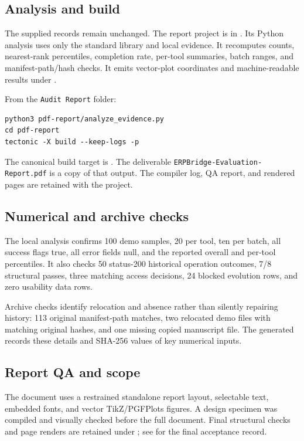 \subsection*{Analysis and build}
The supplied records remain unchanged. The report project is in . Its Python analysis uses only the standard library and local evidence. It recomputes counts, nearest-rank percentiles, completion rate, per-tool summaries, batch ranges, and manifest-path/hash checks. It emits vector-plot coordinates and machine-readable results under .

From the \texttt{Audit Report} folder:
\begin{lstlisting}[numbers=none,basicstyle=\CodeFont\footnotesize]
python3 pdf-report/analyze_evidence.py
cd pdf-report
tectonic -X build --keep-logs -p
\end{lstlisting}
The canonical build target is . The deliverable \texttt{ERPBridge-Evaluation-Report.pdf} is a copy of that output. The compiler log, QA report, and rendered pages are retained with the project.

\subsection*{Numerical and archive checks}
The local analysis confirms 100 demo samples, 20 per tool, ten per batch, all success flags true, all error fields null, and the reported overall and per-tool percentiles. It also checks 50 status-200 historical operation outcomes, 7/8 structural passes, three matching access decisions, 24 blocked evolution rows, and zero usability data rows.

Archive checks identify relocation and absence rather than silently repairing history: 113 original manifest-path matches, two relocated demo files with matching original hashes, and one missing copied manuscript file. The generated  records these details and SHA-256 values of key numerical inputs.

\subsection*{Report QA and scope}
The document uses a restrained standalone report layout, selectable text, embedded fonts, and vector TikZ/PGFPlots figures. A design specimen was compiled and visually checked before the full document. Final structural checks and page renders are retained under ; see  for the final acceptance record.

